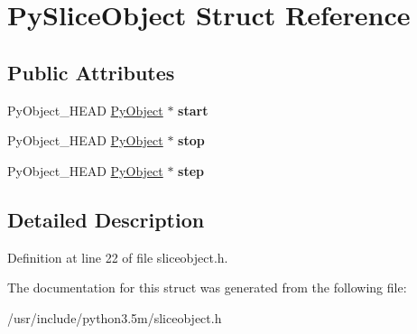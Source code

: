 \hypertarget{structPySliceObject}{}\section{Py\+Slice\+Object Struct Reference}
\label{structPySliceObject}
\subsection*{Public Attributes}
\begin{DoxyCompactItemize}
\item 
Py\+Object\+\_\+\+H\+E\+AD \hyperlink{struct__object}{Py\+Object} $\ast$ {\bfseries start}\hypertarget{structPySliceObject_a0fb36c5bd889b5ba588454d6f3dfef0d}{}\label{structPySliceObject_a0fb36c5bd889b5ba588454d6f3dfef0d}

\item 
Py\+Object\+\_\+\+H\+E\+AD \hyperlink{struct__object}{Py\+Object} $\ast$ {\bfseries stop}\hypertarget{structPySliceObject_a742f61e756c53435c990658d22f9f463}{}\label{structPySliceObject_a742f61e756c53435c990658d22f9f463}

\item 
Py\+Object\+\_\+\+H\+E\+AD \hyperlink{struct__object}{Py\+Object} $\ast$ {\bfseries step}\hypertarget{structPySliceObject_ae7c2f6781b414d4c94fd25c14ff67a11}{}\label{structPySliceObject_ae7c2f6781b414d4c94fd25c14ff67a11}

\end{DoxyCompactItemize}


\subsection{Detailed Description}


Definition at line 22 of file sliceobject.\+h.



The documentation for this struct was generated from the following file\+:\begin{DoxyCompactItemize}
\item 
/usr/include/python3.\+5m/sliceobject.\+h\end{DoxyCompactItemize}
